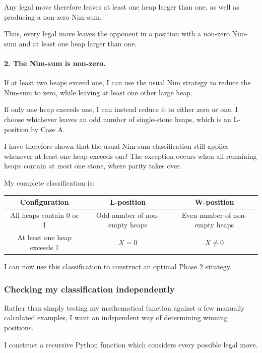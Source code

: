 \documentclass[11pt]{article}
\newcommand{\keywordfont}{\textsc}
\newcommand{\keyword}[1]{%
  \marginpar{\raggedright\small\keywordfont{#1}}}
\begin{document}
Any legal move therefore leaves at least one heap larger than one, as well as producing a non-zero Nim-sum.

Thus, every legal move leaves the opponent in a position with a non-zero Nim-sum and at least one heap larger than one.

\paragraph{2. The Nim-sum is non-zero.}

If at least two heaps exceed one, I can use the usual Nim strategy to reduce the Nim-sum to zero, while leaving at least one other large heap.

If only one heap exceeds one, I can instead reduce it to either zero or one. I choose whichever leaves an odd number of single-stone heaps, which is an L-position by Case A.

I have therefore shown \keyword{Aha} that the usual Nim-sum classification still applies whenever at least one heap exceeds one! The exception occurs when all remaining heaps contain at most one stone, where parity takes over.

My complete classification is:

\begin{center}
\begin{tabular}{|c|c|c|}
    \hline
    \textbf{Configuration} & \textbf{L-position} & \textbf{W-position}\\
    \hline
    All heaps contain 0 or 1 & Odd number of non-empty heaps & Even number of non-empty heaps\\
    \hline
    At least one heap exceeds 1 & $X=0$ & $X\neq 0$\\
    \hline
\end{tabular}
\end{center}

I can now use this classification to construct an optimal Phase 2 strategy.

\subsubsection{Checking my classification independently}

Rather than simply testing my mathematical function against a few manually calculated examples, I want an independent way of determining winning positions.

I construct a recursive Python function which considers every possible legal move.
\end{document}
